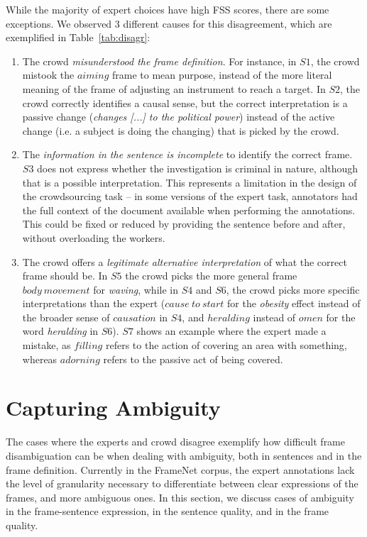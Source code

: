 While the majority of expert choices have high FSS scores, there are some exceptions. We observed 3 different causes for this disagreement, which are exemplified in Table~\ref{tab:disagr}:

\begin{enumerate}

\item The crowd \textit{misunderstood the frame definition}. For instance, in $S1$, the crowd mistook the $aiming$ frame to mean purpose, instead of the more literal meaning of the frame of adjusting an instrument to reach a target. In $S2$, the crowd correctly identifies a causal sense, but the correct interpretation is a passive change (\textit{changes [...] to the political power}) instead of the active change (i.e. a subject is doing the changing) that is picked by the crowd.

\item The \textit{information in the sentence is incomplete} to identify the correct frame. $S3$ does not express whether the investigation is criminal in nature, although that is a possible interpretation. This represents a limitation in the design of the crowdsourcing task -- in some versions of the expert task, annotators had the full context of the document available when performing the annotations. This could be fixed or reduced by providing the sentence before and after, without overloading the workers.

\item The crowd offers a \textit{legitimate alternative interpretation} of what the correct frame should be. In $S5$ the crowd picks the more general frame $body\ movement$ for \textit{waving}, while in $S4$ and $S6$, the crowd picks more specific interpretations than the expert ($cause\ to\ start$ for the \textit{obesity} effect instead of the broader sense of $causation$ in $S4$, and $heralding$ instead of $omen$ for the word \textit{heralding} in $S6$). $S7$ shows an example where the expert made a mistake, as $filling$ refers to the action of covering an area with something, whereas $adorning$ refers to the passive act of being covered.

\end{enumerate}


\section{Capturing Ambiguity}
\label{sec:frame-ambig}

The cases where the experts and crowd disagree exemplify how difficult frame disambiguation can be when dealing with ambiguity, both in sentences and in the frame definition. Currently in the FrameNet corpus, the expert annotations lack the level of granularity necessary to differentiate between clear expressions of the frames, and more ambiguous ones.  In this section, we discuss cases of ambiguity in the frame-sentence expression, in the sentence quality, and in the frame quality.

